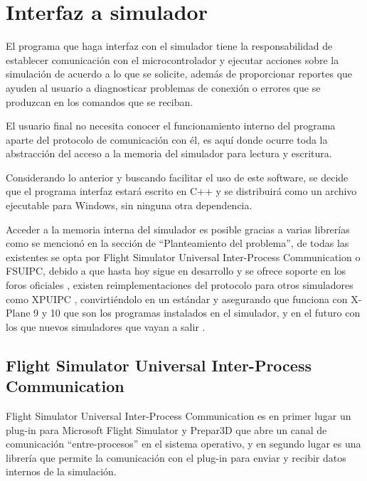 \section{Interfaz a simulador}

El programa que haga interfaz con el simulador tiene la responsabilidad de establecer comunicación con el microcontrolador y ejecutar acciones sobre la simulación de acuerdo a lo que se solicite, además de proporcionar reportes que ayuden al usuario a diagnosticar problemas de conexión o errores que se produzcan en los comandos que se reciban.

El usuario final no necesita conocer el funcionamiento interno del programa aparte del protocolo de comunicación con él, es aquí donde ocurre toda la abstracción del acceso a la memoria del simulador para lectura y escritura.

Considerando lo anterior y buscando facilitar el uso de este software, se decide que el programa interfaz estará escrito en C++ y se distribuirá como un archivo ejecutable para Windows, sin ninguna otra dependencia.

Acceder a la memoria interna del simulador es posible gracias a varias librerías como se mencionó en la sección de ``Planteamiento del problema'', de todas las existentes se opta por Flight Simulator Universal Inter-Process Communication o FSUIPC, debido a que hasta hoy sigue en desarrollo y se ofrece soporte en los foros oficiales \cite{fsuipcforum}, existen reimplementaciones del protocolo para otros simuladores como XPUIPC \cite{xpuipc}, convirtiéndolo en un estándar y asegurando que funciona con X-Plane 9 y 10 que son los programas instalados en el simulador, y en el futuro con los que nuevos simuladores que vayan a salir \cite{xpuipc12}.

\subsection{Flight Simulator Universal Inter-Process Communication}

Flight Simulator Universal Inter-Process Communication \cite{fsuipc} es en primer lugar un plug-in para Microsoft Flight Simulator y Prepar3D que abre un canal de comunicación ``entre-procesos'' en el sistema operativo, y en segundo lugar es una librería que permite la comunicación con el plug-in para enviar y recibir datos internos de la simulación.

